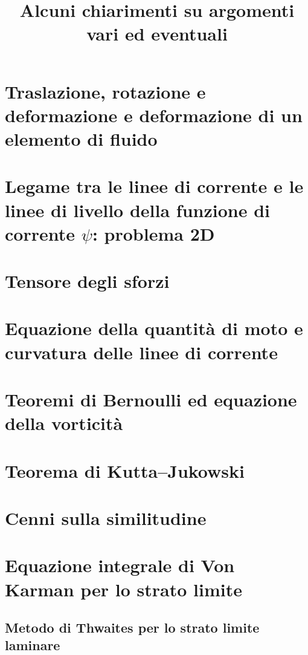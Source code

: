 \documentclass[11pt,fleqn]{article}
\title{Alcuni chiarimenti su argomenti vari ed eventuali}
\begin{document}
\maketitle

\tableofcontents


\section{Traslazione, rotazione e deformazione e deformazione di un elemento di fluido}

\clearpage \newpage

\section{Legame tra le linee di corrente e le linee di livello della funzione di corrente $\psi$: problema 2D}

\clearpage \newpage

\section{Tensore degli sforzi}

\clearpage \newpage

\section{Equazione della quantità di moto e curvatura delle linee di corrente}

\clearpage \newpage

\section{Teoremi di Bernoulli ed equazione della vorticità}

\clearpage \newpage

\section{Teorema di Kutta--Jukowski}

\clearpage \newpage

\section{Cenni sulla similitudine}

\clearpage \newpage

\section{Equazione integrale di Von Karman per lo strato limite}


\subsection{Metodo di Thwaites per lo strato limite laminare}

\clearpage \newpage
\end{document}
